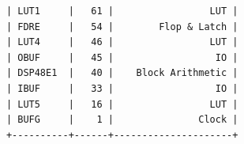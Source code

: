 \documentclass{article}
\begin{document}
\begin{enumerate}
\begin{table}[htbp]
\begin{minipage}{0.4\textwidth}
\begin{verbatim}
            | LUT1     |   61 |                 LUT |
            | FDRE     |   54 |        Flop & Latch |
            | LUT4     |   46 |                 LUT |
            | OBUF     |   45 |                  IO |
            | DSP48E1  |   40 |    Block Arithmetic |
            | IBUF     |   33 |                  IO |
            | LUT5     |   16 |                 LUT |
            | BUFG     |    1 |               Clock |
            +----------+------+---------------------+
            \end{verbatim}
        \end{minipage}
        \label{table:resource_usage}
    \end{table}

\end{enumerate}
\end{document}
